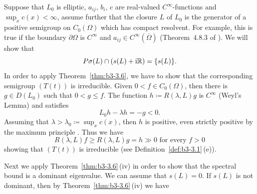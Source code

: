 \begin{examples}
\begin{enumerate}[\upshape (i), wide, labelindent=.25em]
	Suppose that $L_{0}$ is elliptic, $a_{ij}$, $b_{i}$, $c$ are real-valued $C^{\infty}$-functions and $\sup_x c(x) < \infty$, assume further that the closure $L$ of\/ $L_{0}$ is the generator of a positive semigroup on $C_{0}(\Omega)$ which has compact resolvent.
	For example, this is true if the boundary  $\partial\Omega$ is $C^{\infty}$ and $a_{ij} \in C^{\infty}(\overline{\Omega})$ (\cf Theorem~4.8.3 of \textcite{fattorini:1983}).
	We will show that 
    \[
    P\sigma(L)\cap(s(L) + \mathrm{i}\mathbb{R}) = \{s(L)\} .
    \]
	In order to apply Theorem~\ref{thm:b3-3.6}, we have to show that the corresponding semigroup $(T(t))$ is irreducible.
	Given $0 < f \in C_{0}(\Omega)$, then there is $g \in D(L_{0})$ such that $0 < g \leq f$. The function 
	$h \coloneq R(\lambda,L)g$ is $C^{\infty}$ (Weyl's Lemma) and satisfies 
    \[
    L_{0}h - \lambda h = -g < 0 .
    \]
	Assuming that $\lambda > \lambda_{0} \coloneq \sup_x c(x)$, then $h$ is positive, even strictly positive by the maximum principle \textcite[Chapter~2, Theorem~6]{protterweinberger:1967}.
	Thus we have  
    \[ 
    R(\lambda,L)f \geq R(\lambda,L)g = h \gg 0 \text{ for every } f>0 
    \]
    showing that $(T(t))$ is irreducible (see Definition~\ref{def:b3-3.1}\,(e)).

Next we apply Theorem~\ref{thm:b3-3.6}\,(iv) in order to show that the spectral bound is a dominant eigenvalue.
	We can assume that $s(L) = 0$.
	If\/ $s(L)$ is not dominant, then by Theorem~\ref{thm:b3-3.6}\,(iv) we have
	

\end{enumerate}
\end{examples}
